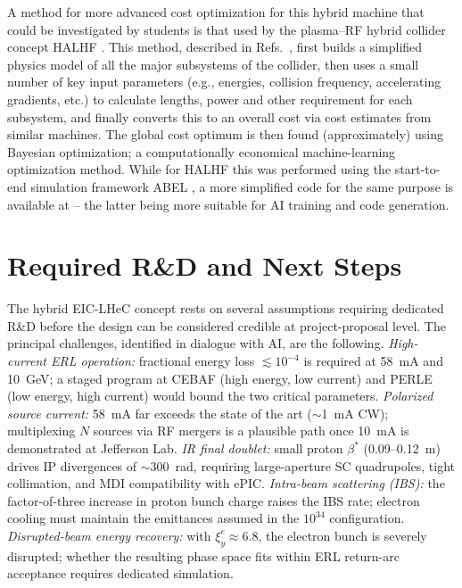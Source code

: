 \documentclass[%
               refpage       %
               hyphens,      %
               ]{jacow}
\begin{document}
A method for more advanced cost optimization for this hybrid machine that could be investigated by students is that used by the plasma--RF hybrid collider concept HALHF \cite{HALHF2023}. This method, described in Refs.~\cite{HALHF_ESSPU,HALHF_IPAC}, first builds a simplified physics model of all the major subsystems of the collider, then uses a small number of key input parameters (e.g., energies, collision frequency, accelerating gradients, etc.) to calculate lengths, power and other requirement for each subsystem, and finally converts this to an overall cost via cost estimates from similar machines. The global cost optimum is then found (approximately) using Bayesian optimization; a computationally economical machine-learning optimization method. While for HALHF this was performed using the start-to-end simulation framework ABEL \cite{ABEL,ABEL_GITHUB}, a more simplified code for the same purpose is available at \cite{COSTMODEL} -- the latter being more suitable for AI training and code generation.

 
\section{Required R\&D and Next Steps}

The hybrid EIC-LHeC concept rests on several assumptions requiring 
dedicated R\&D before the design can be considered credible at 
project-proposal level. The principal challenges, identified in dialogue 
with AI, are the following. \textit{High-current ERL operation:} 
fractional energy loss $\lesssim 10^{-4}$ is required at 58~mA and 
10~GeV; a staged program at CEBAF (high energy, low current) and PERLE 
(low energy, high current) would bound the two critical parameters. 
\textit{Polarized source current:} 58~mA far exceeds the state of the 
art ($\sim$1~mA CW); multiplexing $N$ sources via RF mergers is a 
plausible path once 10~mA is demonstrated at Jefferson Lab. 
\textit{IR final doublet:} small proton $\beta^*$ (0.09--0.12~m) drives 
IP divergences of $\sim$300~\textmu rad, requiring large-aperture SC 
quadrupoles, tight collimation, and MDI compatibility with ePIC. 
\textit{Intra-beam scattering (IBS):} the factor-of-three increase in proton 
bunch charge raises the IBS rate; electron cooling must maintain the 
emittances assumed in the $10^{34}$ configuration. 
\textit{Disrupted-beam energy recovery:} with $\xi_y^e \approx 6.8$, 
the electron bunch is severely disrupted; whether the resulting 
phase space fits within ERL return-arc acceptance requires dedicated 
simulation.
\end{document}
